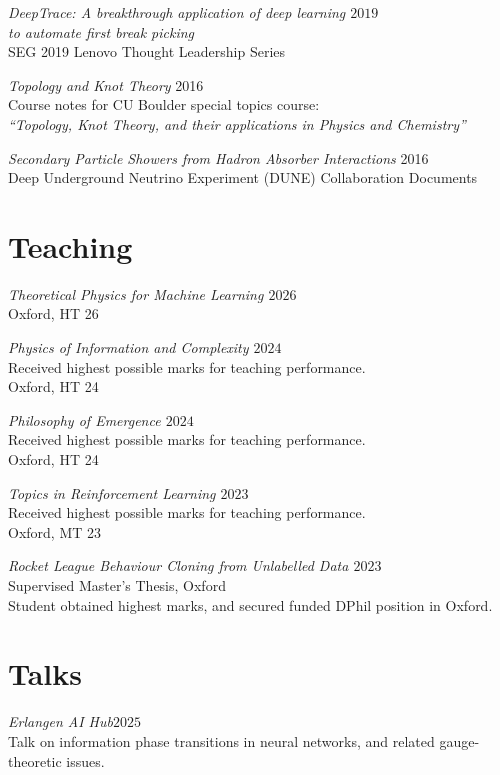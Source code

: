 \documentclass[margin]{res}
\begin{document}
\begin{resume}
                {\sl DeepTrace: A breakthrough application of deep learning \hfill $2019$\\ to automate first break picking}  \\
                SEG 2019 Lenovo Thought Leadership Series

                {\sl Topology and Knot Theory} \hfill 2016 \\
                Course notes for CU Boulder special topics course: \\
                \textit{``Topology, Knot Theory, and their applications in Physics and Chemistry''}

                {\sl Secondary Particle Showers from Hadron Absorber Interactions} \hfill 2016 \\
                Deep Underground Neutrino Experiment (DUNE) Collaboration Documents


                \section{Teaching}
                {\sl Theoretical Physics for Machine Learning \hfill $2026$}\\
                Oxford, HT 26
                
                {\sl Physics of Information and Complexity \hfill $2024$}\\
                Received highest possible marks for teaching performance.\\
                Oxford, HT 24

                {\sl Philosophy of Emergence \hfill $2024$}\\
                Received highest possible marks for teaching performance.\\
                Oxford, HT 24

                {\sl Topics in Reinforcement Learning \hfill $2023$}\\
                Received highest possible marks for teaching performance.\\
                Oxford, MT 23

                {\sl Rocket League Behaviour Cloning from Unlabelled Data \hfill $2023$}\\
                Supervised Master's Thesis, Oxford\\
                Student obtained highest marks, and secured funded DPhil position in Oxford.

                \section{Talks}
                {\sl Erlangen AI Hub\hfill $2025$}\\
                Talk on information phase transitions in neural networks, and related gauge-theoretic issues.


\end{resume}
\end{document}
